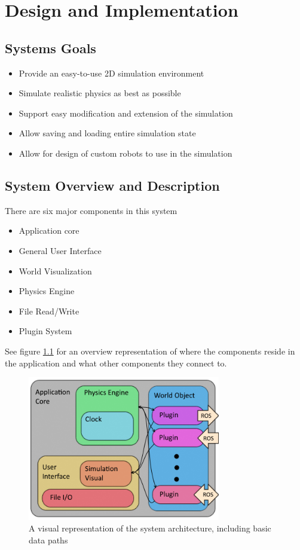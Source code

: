 

\chapter{Design  and Implementation}

\section{Systems Goals}
\begin{itemize}
	\item Provide an easy-to-use 2D simulation environment
	\item Simulate realistic physics as best as possible
	\item Support easy modification and extension of the simulation
	\item Allow saving and loading entire simulation state
	\item Allow for design of custom robots to use in the simulation
\end{itemize}

\section{System Overview and Description}
There are six major components in this system
\begin{itemize}
	\item Application core
	\item General User Interface
	\item World Visualization
	\item Physics Engine
	\item File Read/Write
	\item Plugin System
\end{itemize}
See figure \ref{fig:systemdiagram} for an overview representation of where the components reside in the application and what other components they connect to.

\begin{figure}[tbh]
\begin{center}
\includegraphics[width=0.75\textwidth]{./images_design/sysarch}
\end{center}
\caption{A visual representation of the system architecture, including basic data paths\label{fig:systemdiagram}}
\end{figure}

